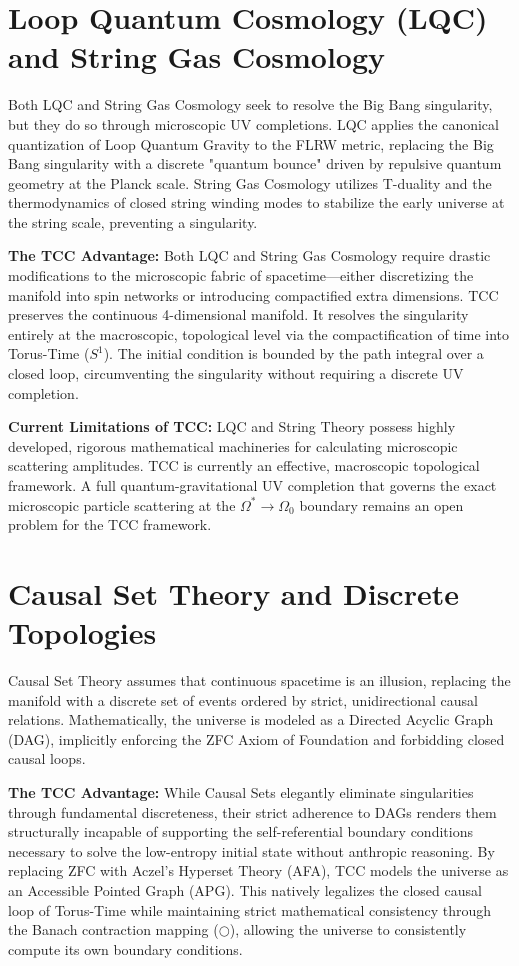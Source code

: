 \documentclass[12pt,openany]{book}
\theoremstyle{plain}
\theoremstyle{definition}
\theoremstyle{remark}
\begin{document}
\section{Loop Quantum Cosmology (LQC) and String Gas Cosmology}

Both LQC and String Gas Cosmology seek to resolve the Big Bang singularity, but they do so through microscopic UV completions. LQC applies the canonical quantization of Loop Quantum Gravity to the FLRW metric, replacing the Big Bang singularity with a discrete "quantum bounce" driven by repulsive quantum geometry at the Planck scale. String Gas Cosmology utilizes T-duality and the thermodynamics of closed string winding modes to stabilize the early universe at the string scale, preventing a singularity.

\textbf{The TCC Advantage:} Both LQC and String Gas Cosmology require drastic modifications to the microscopic fabric of spacetime—either discretizing the manifold into spin networks or introducing compactified extra dimensions. TCC preserves the continuous 4-dimensional manifold. It resolves the singularity entirely at the macroscopic, topological level via the compactification of time into Torus-Time ($S^1$). The initial condition is bounded by the path integral over a closed loop, circumventing the singularity without requiring a discrete UV completion.

\textbf{Current Limitations of TCC:} LQC and String Theory possess highly developed, rigorous mathematical machineries for calculating microscopic scattering amplitudes. TCC is currently an effective, macroscopic topological framework. A full quantum-gravitational UV completion that governs the exact microscopic particle scattering at the $\Omega^* \to \Omega_0$ boundary remains an open problem for the TCC framework.

\section{Causal Set Theory and Discrete Topologies}

Causal Set Theory assumes that continuous spacetime is an illusion, replacing the manifold with a discrete set of events ordered by strict, unidirectional causal relations. Mathematically, the universe is modeled as a Directed Acyclic Graph (DAG), implicitly enforcing the ZFC Axiom of Foundation and forbidding closed causal loops.

\textbf{The TCC Advantage:} While Causal Sets elegantly eliminate singularities through fundamental discreteness, their strict adherence to DAGs renders them structurally incapable of supporting the self-referential boundary conditions necessary to solve the low-entropy initial state without anthropic reasoning. By replacing ZFC with Aczel's Hyperset Theory (AFA), TCC models the universe as an Accessible Pointed Graph (APG). This natively legalizes the closed causal loop of Torus-Time while maintaining strict mathematical consistency through the Banach contraction mapping ($\bigcirc$), allowing the universe to consistently compute its own boundary conditions.
\end{document}
